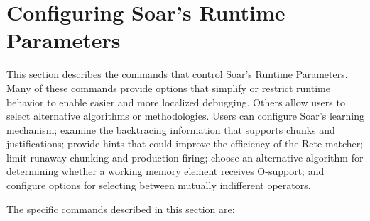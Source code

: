 








\section{Configuring Soar's Runtime Parameters}
\label{RUNTIME}

This section describes the commands that control Soar's Runtime Parameters.
Many of these commands provide options that simplify or restrict 
runtime behavior to enable easier and more localized debugging.
Others allow users to select alternative algorithms or methodologies.
Users can configure Soar's learning mechanism; examine the
backtracing information that supports chunks and justifications;
provide hints that could improve the efficiency of the Rete matcher;
limit runaway chunking and production firing;
choose an alternative algorithm for determining whether a working memory
element receives O-support;  and 
configure options for selecting between mutually indifferent operators.

The specific commands described in this section are:

